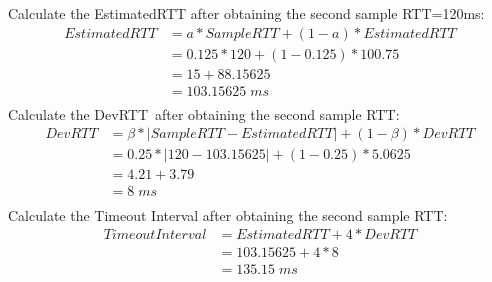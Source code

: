 \documentclass[12pt,a4paper]{article}
\begin{document}
Calculate the EstimatedRTT after obtaining the second sample RTT=120ms:
\begin{equation*}
    \begin{split}
        EstimatedRTT &= a * SampleRTT+(1- a) * EstimatedRTT \\
                     &= 0.125 * 120 + (1-0.125) * 100.75 \\
                     &= 15 + 88.15625\\
                     &= 103.15625 \; ms \\
    \end{split}
\end{equation*}
Calculate the DevRTT after obtaining the second sample RTT:
\begin{equation*}
    \begin{split}
        DevRTT &= \beta * | SampleRTT- EstimatedRTT|+(1- \beta )* DevRTT \\
                     &= 0.25 * |120-103.15625| + (1-0.25) *5.0625 \\
                     &= 4.21 + 3.79 \\
                     &= 8 \; ms \\
    \end{split}
\end{equation*}
Calculate the Timeout Interval after obtaining the second sample RTT:
\begin{equation*}
    \begin{split}
        TimeoutInterval &= EstimatedRTT +4* DevRTT \\
                     &= 103.15625 + 4 *8\\
                     &= 135.15 \; ms\\
    \end{split}
\end{equation*}
\end{document}
